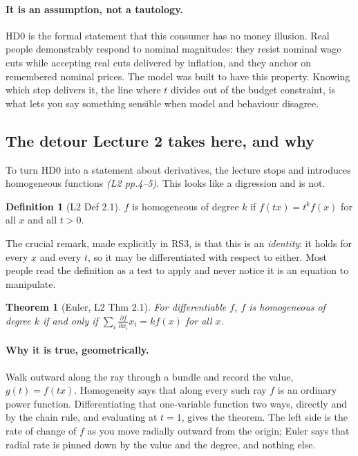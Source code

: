 \documentclass[11pt]{article}
\newtheorem{theorem}{Theorem}
\theoremstyle{definition}
\newtheorem{definition}{Definition}
\newcommand{\pdd}[2]{\frac{\partial #1}{\partial #2}}
\newcommand{\src}[1]{\textit{\small (#1)}}
\begin{document}
\paragraph{It is an assumption, not a tautology.} HD0 is the formal statement that this
consumer has no money illusion. Real people demonstrably respond to nominal magnitudes:
they resist nominal wage cuts while accepting real cuts delivered by inflation, and they
anchor on remembered nominal prices. The model was built to have this property. Knowing
which step delivers it, the line where $t$ divides out of the budget constraint, is what
lets you say something sensible when model and behaviour disagree.

\subsection{The detour Lecture 2 takes here, and why}

To turn HD0 into a statement about derivatives, the lecture stops and introduces
homogeneous functions \src{L2 pp.4--5}. This looks like a digression and is not.

\begin{definition}[L2 Def 2.1]
$f$ is homogeneous of degree $k$ if $f(tx)=t^kf(x)$ for all $x$ and all $t>0$.
\end{definition}

The crucial remark, made explicitly in RS3, is that this is an \emph{identity}: it holds for
every $x$ and every $t$, so it may be differentiated with respect to either. Most people
read the definition as a test to apply and never notice it is an equation to manipulate.

\begin{theorem}[Euler, L2 Thm 2.1]
For differentiable $f$, $f$ is homogeneous of degree $k$ if and only if
$\sum_i \pdd{f}{x_i}x_i = k f(x)$ for all $x$.
\end{theorem}

\paragraph{Why it is true, geometrically.} Walk outward along the ray through a bundle and
record the value, $g(t)=f(tx)$. Homogeneity says that along every such ray $f$ is an
ordinary power function. Differentiating that one-variable function two ways, directly and
by the chain rule, and evaluating at $t=1$, gives the theorem. The left side is the rate of
change of $f$ as you move radially outward from the origin; Euler says that radial rate is
pinned down by the value and the degree, and nothing else.
\end{document}
